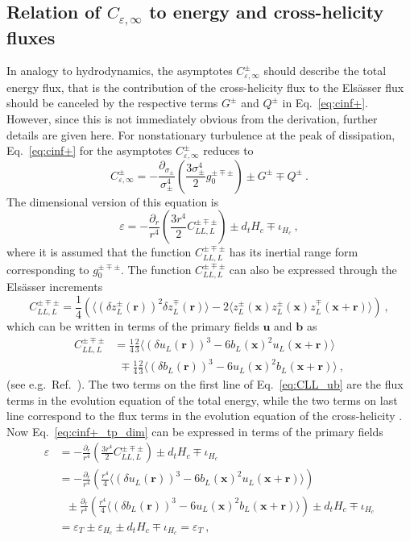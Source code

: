 \documentclass[aps,pre,onecolumn,superscriptaddress,notitlepage]{revtex4-1}
\newcommand{\Cinf}{C_{\varepsilon,\infty}}
\newcommand{\vep}{\varepsilon}
\newcommand{\sigmapm}{\sigma_\pm}
\renewcommand{\vec}[1]{\bm{#1}}
\renewcommand{\vr}{\vec{r}}
\newcommand{\beq}{\begin{equation}}
\newcommand{\eeq}{\end{equation}}
\begin{document}
\subsection{Relation of $\Cinf$ to energy and cross-helicity fluxes}
In analogy to hydrodynamics, the asymptotes $\Cinf^\pm$ should 
describe the total energy flux, that is  
the contribution of the cross-helicity flux to the
Els\"{a}sser flux should be canceled by the respective terms $G^\pm$ and $Q^\pm$ in  
Eq.~\eqref{eq:cinf+}.
However, since this is not immediately obvious from the derivation, 
further details are given here. 
For 
nonstationary turbulence at the peak of dissipation, Eq.~\eqref{eq:cinf+} for the 
asymptotes $\Cinf^\pm$ reduces to
\beq
\label{eq:cinf+_tp}
\Cinf^\pm = -\frac{\partial_{\sigmapm}}{\sigmapm^4} \left(\frac{3\sigmapm^4}{2}g_0^{\pm\mp\pm}\right)  \pm  G^\pm \mp  Q^\pm \ .
\eeq
The dimensional version of this equation is
\beq
\label{eq:cinf+_tp_dim}
\vep = -\frac{\partial_r}{r^4} \left(\frac{3r^4}{2}C_{LL,L}^{\pm\mp\pm}\right)  \pm  d_t H_c \mp \iota_{H_c}\ ,
\eeq
where it is assumed that the function $C_{LL,L}^{\pm\mp\pm}$ has its inertial range form corresponding to $g_0^{\pm\mp\pm}$.
The function $C_{LL,L}^{\pm\mp\pm}$ can also be expressed through the Els\"asser increments \cite{Politano98}  %
\beq
C_{LL,L}^{\pm\mp\pm}
=\frac{1}{4}\left ( \langle (\delta  z_L^\pm(\vr))^2 \delta z_L^\mp(\vr)\rangle
-2\langle z_L^\pm(\vec{x}) z_L^\pm(\vec{x}) z_L^\mp(\vec{x} + \vec{r}) \rangle \right ) \ ,
\eeq
which can be written in terms of the primary fields $\vec{u}$ and $\vec{b}$ as
\begin{align}
\label{eq:CLL_ub}
C_{LL,L}^{\pm\mp\pm}&=
 \frac{1}{4}\frac{2}{3}\langle(\delta u_L(\vr))^3 - 6  b_L(\vec{x})^2 u_L(\vec{x}+\vec{r}) \rangle \nonumber \\
& \ \ \mp \frac{1}{4} \frac{2}{3}\langle(\delta b_L(\vr))^3 - 6  u_L(\vec{x})^2 b_L(\vec{x}+\vec{r}) \rangle \ ,
\end{align}
(see e.g.~Ref.~\cite{Politano98}).
The two terms on the first line of Eq.~\eqref{eq:CLL_ub} are the 
flux terms in the evolution equation of the total energy, while
the two terms on last line correspond to the flux
terms in the evolution equation of the cross-helicity \cite{Politano98}.
Now Eq.~\eqref{eq:cinf+_tp_dim} can be expressed in terms of the primary fields 
\begin{align}
\label{eq:cinf+_tp2}
\vep &= -\frac{\partial_r}{r^4} \left(\frac{3r^4}{2}C_{LL,L}^{\pm\mp\pm}\right)  \pm  d_t H_c \mp \iota_{H_c} \nonumber \\
&=-\frac{\partial_r}{r^4} \left(\frac{r^4}{4}  \langle(\delta u_L(\vr))^3 - 6  b_L(\vec{x})^2 u_L(\vec{x}+\vec{r}) \rangle \right) \nonumber \\
& \ \  \ \pm \frac{\partial_r}{r^4} \left(\frac{r^4}{4}  \langle(\delta b_L(\vr))^3 - 6  u_L(\vec{x})^2 b_L(\vec{x}+\vec{r}) \rangle  \right) 
\pm d_t H_c \mp \iota_{H_c} \nonumber \\
&= \vep_T \pm \vep_{H_c} \pm d_t H_c \mp \iota_{H_c}= \vep_T \ ,
\end{align}
\end{document}
